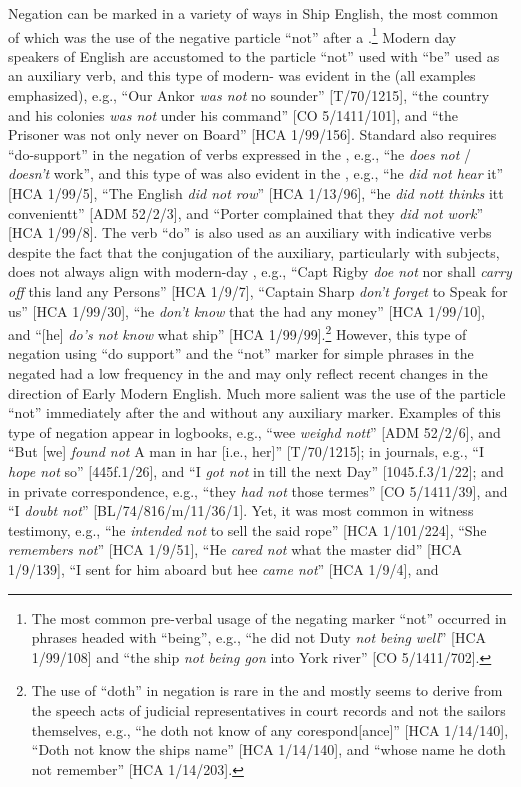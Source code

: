 Negation can be marked in a variety of ways in Ship English, the most common of which was the use of the negative particle “not” after a .\footnote{The most common pre-verbal usage of the negating marker “not” occurred in phrases headed with “being”, e.g., “he did not Duty \textit{not being well}” [HCA 1/99/108] and “the  ship \textit{not being gon} into York river” [CO 5/1411/702].} Modern day speakers of English are accustomed to the particle “not” used with  “be”  used as an auxiliary verb, and this type of modern- was evident in the  (all examples emphasized), e.g., “Our Ankor \textit{was not} no sounder” [T/70/1215], “the country and his colonies \textit{was not} under his command” [CO 5/1411/101], and “the Prisoner was not only never on Board” [HCA 1/99/156]. Standard  also requires “do-support” in the negation of verbs expressed in the  , e.g., “he \textit{does not} / \textit{doesn’t} work”, and this type of  was also evident in the , e.g., “he \textit{did not hear} it” [HCA 1/99/5], “The English \textit{did not row}” [HCA 1/13/96], “he \textit{did nott thinks} itt convenientt” [ADM 52/2/3], and “Porter complained that they \textit{did not work}” [HCA 1/99/8]. The verb “do” is also used as an auxiliary with indicative verbs despite the fact that the conjugation of the auxiliary, particularly with  subjects, does not always align with modern-day , e.g., “Capt Rigby \textit{doe not} nor shall \textit{carry off} this land any Persons” [HCA 1/9/7], “Captain Sharp \textit{don’t forget} to Speak for us” [HCA 1/99/30], “he \textit{don’t know} that the  had any money” [HCA 1/99/10], and “[he] \textit{do’s not know} what ship” [HCA 1/99/99].\footnote{The use of “doth” in negation is rare in the  and mostly seems to derive from the speech acts of judicial representatives in court records and not the sailors themselves, e.g., “he doth not know of any corespond[ance]” [HCA 1/14/140], “Doth not know the ships name” [HCA 1/14/140], and “whose name he doth not remember” [HCA 1/14/203].}  However, this type of negation using “do support” and the “not” marker for simple  phrases in the negated  had a low frequency in the  and may only reflect recent changes in the direction of Early Modern English. Much more salient was the use of the particle “not” immediately after the  and without any auxiliary marker. Examples of this type of negation appear in logbooks, e.g., “wee \textit{weighd nott}” [ADM 52/2/6], and “But [we] \textit{found not} A man in har [i.e., her]” [T/70/1215]; in journals, e.g., “I \textit{hope not} so” [445f.1/26], and “I \textit{got not} in till the next Day” [1045.f.3/1/22]; and in private correspondence, e.g., “they \textit{had not} those termes” [CO 5/1411/39], and “I \textit{doubt not}” [BL/74/816/m/11/36/1]. Yet, it was most common in witness testimony, e.g., “he \textit{intended not} to sell the said rope” [HCA 1/101/224], “She \textit{remembers not}” [HCA 1/9/51], “He \textit{cared not} what the master did” [HCA 1/9/139], “I sent for him aboard but hee \textit{came not}” [HCA 1/9/4], and 